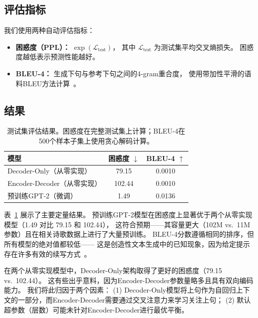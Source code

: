 \documentclass[11pt,a4paper]{article}
\begin{document}
\subsection{评估指标}

我们使用两种自动评估指标：
\begin{itemize}[nosep]
    \item \textbf{困惑度（PPL）：}
          \(\exp(\mathcal{L}_{\text{test}})\)，
          其中 \(\mathcal{L}_{\text{test}}\) 为测试集平均交叉熵损失。
          困惑度越低表示预测性能越好。
    \item \textbf{BLEU-4：}
          生成下句与参考下句之间的4-gram重合度，
          使用带加性平滑的语料BLEU方法计算~\cite{papineni2002bleu}。
\end{itemize}

\subsection{结果}

\begin{table}[H]
\centering
\small
\renewcommand{\arraystretch}{1.1}
\caption{测试集评估结果。困惑度在完整测试集上计算；BLEU-4在500个样本子集上使用贪心解码计算。}
\label{tab:results}
\begin{tabular}{lcc}
\toprule
\textbf{模型}                          & \textbf{困惑度 \(\downarrow\)} & \textbf{BLEU-4 \(\uparrow\)} \\
\midrule
Decoder-Only（从零实现）               & 79.15   & 0.0010 \\
Encoder-Decoder（从零实现）            & 102.44  & 0.0010 \\
预训练GPT-2（微调）                    & 1.49    & 0.0136 \\
\bottomrule
\end{tabular}
\end{table}

表~\ref{tab:results} 展示了主要定量结果。
预训练GPT-2模型在困惑度上显著优于两个从零实现模型（1.49 对比 79.15 和 102.44），
这符合预期——其容量更大（102M vs.~11M参数）且在相关诗歌数据上进行了大量预训练。
BLEU-4分数遵循相同的排序，但所有模型的绝对值都较低——
这是创造性文本生成中的已知现象，因为给定提示存在许多有效的续写方式~\cite{novikova2017why}。

在两个从零实现模型中，Decoder-Only架构取得了更好的困惑度（79.15 vs.~102.44）。
这有些出乎意料，因为Encoder-Decoder参数量略多且具有双向编码能力。
我们将此归因于两个因素：
(1) Decoder-Only模型将上句作为自回归上下文的一部分，而Encoder-Decoder需要通过交叉注意力来学习关注上句；
(2) 默认超参数（层数）可能未针对Encoder-Decoder进行最优平衡。
\end{document}
